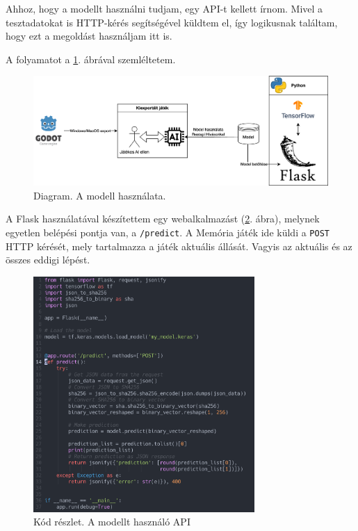 Ahhoz, hogy a modellt használni tudjam, egy API-t kellett írnom. Mivel a tesztadatokat is HTTP-kérés segítségével küldtem el, így logikusnak találtam, hogy ezt a megoldást használjam itt is. 

A folyamatot a \ref{code:modell_hasznalata}. ábrával szemléltetem.

\begin{figure}[h]
    \center
    \includegraphics[width=\textwidth]{img/kiexportalt.drawio.png}
    \caption{Diagram. A modell használata.}
    \label{code:modell_hasznalata}
\end{figure}


A Flask használatával készítettem egy webalkalmazást (\ref{code:use_model}. ábra), melynek egyetlen belépési pontja van, a \lstinline{/predict}. A Memória játék ide küldi a \lstinline{POST} HTTP kérését, mely tartalmazza a játék aktuális állását. 
Vagyis az aktuális és az összes eddigi lépést.




\begin{figure}[h]
    \center
    \includegraphics[width=0.75\textwidth]{img/use_model.png}
    \caption{Kód részlet. A modellt használó API}
    \label{code:use_model}
\end{figure}

